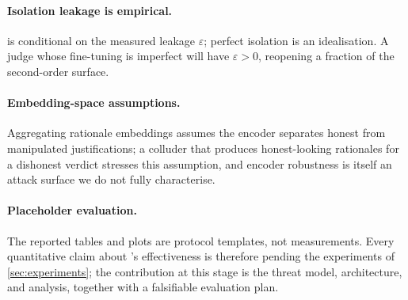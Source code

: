 \paragraph{Isolation leakage is empirical.}
 is conditional on the measured leakage $\varepsilon$; perfect
isolation is an idealisation. A judge whose fine-tuning is imperfect will have
$\varepsilon>0$, reopening a fraction of the second-order surface.

\paragraph{Embedding-space assumptions.}
Aggregating rationale embeddings assumes the encoder separates honest from manipulated
justifications; a colluder that produces honest-looking rationales for a dishonest verdict
stresses this assumption, and encoder robustness is itself an attack surface we do not fully
characterise.

\paragraph{Placeholder evaluation.}
The reported tables and plots are protocol templates, not measurements. Every quantitative
claim about \Aegis's effectiveness is therefore pending the experiments of
\cref{sec:experiments}; the contribution at this stage is the threat model, architecture,
and analysis, together with a falsifiable evaluation plan.
